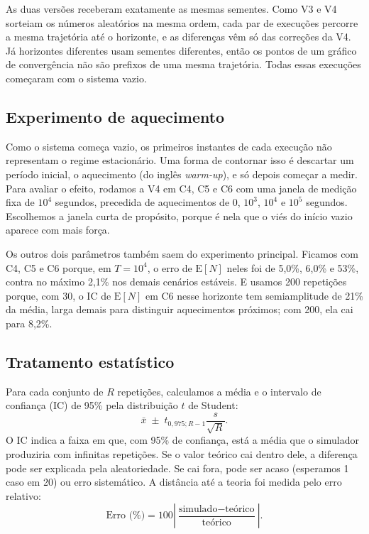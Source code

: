 \documentclass[
  article,      %
  10pt,         %
  oneside,
  a4paper,
  twocolumn,    %
  english,
  brazil        %
]{abntex2}
\newcommand{\EN}{\mathrm{E}[N]}
\begin{document}
As duas versões receberam exatamente as mesmas sementes. Como V3 e V4 sorteiam os números aleatórios na mesma ordem, cada par de execuções percorre a mesma trajetória até o horizonte, e as diferenças vêm só das correções da V4. Já horizontes diferentes usam sementes diferentes, então os pontos de um gráfico de convergência não são prefixos de uma mesma trajetória. Todas essas execuções começaram com o sistema vazio.

\subsection{Experimento de aquecimento}
\label{sec:met-aquecimento}

Como o sistema começa vazio, os primeiros instantes de cada execução não representam o regime estacionário. Uma forma de contornar isso é descartar um período inicial, o aquecimento (do inglês \textit{warm-up}), e só depois começar a medir. Para avaliar o efeito, rodamos a V4 em C4, C5 e C6 com uma janela de medição fixa de $10^4$ segundos, precedida de aquecimentos de 0, $10^3$, $10^4$ e $10^5$ segundos. Escolhemos a janela curta de propósito, porque é nela que o viés do início vazio aparece com mais força.

Os outros dois parâmetros também saem do experimento principal. Ficamos com C4, C5 e C6 porque, em $T=10^4$, o erro de $\EN$ neles foi de 5,0\%, 6,0\% e 53\%, contra no máximo 2,1\% nos demais cenários estáveis. E usamos 200 repetições porque, com 30, o IC de $\EN$ em C6 nesse horizonte tem semiamplitude de 21\% da média, larga demais para distinguir aquecimentos próximos; com 200, ela cai para 8,2\%.

\subsection{Tratamento estatístico}

Para cada conjunto de $R$ repetições, calculamos a média e o intervalo de confiança (IC) de 95\% pela distribuição $t$ de Student:
\begin{equation}
  \bar{x}\;\pm\;t_{0{,}975;R-1}\frac{s}{\sqrt{R}}.
  \label{eq:ic}
\end{equation}
O IC indica a faixa em que, com 95\% de confiança, está a média que o simulador produziria com infinitas repetições. Se o valor teórico cai dentro dele, a diferença pode ser explicada pela aleatoriedade. Se cai fora, pode ser acaso (esperamos 1 caso em 20) ou erro sistemático. A distância até a teoria foi medida pelo erro relativo:
\begin{equation}
  \text{Erro (\%)}=
  100\left|\frac{\text{simulado}-\text{teórico}}{\text{teórico}}\right|.
  \label{eq:erro-relativo}
\end{equation}
\end{document}
